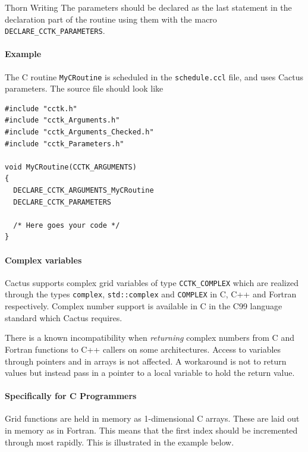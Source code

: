 \begin{cactuspart}{Thorn Writing}
The parameters should be declared as the last statement in the declaration part
of the routine using them with the macro \texttt{DECLARE\_CCTK\_PARAMETERS}.

\paragraph{Example}

The C routine \verb|MyCRoutine| is scheduled in the \texttt{schedule.ccl} file,
and uses Cactus parameters. The source file should look like
\begin{verbatim}
#include "cctk.h"
#include "cctk_Arguments.h"
#include "cctk_Arguments_Checked.h"
#include "cctk_Parameters.h"

void MyCRoutine(CCTK_ARGUMENTS)
{
  DECLARE_CCTK_ARGUMENTS_MyCRoutine
  DECLARE_CCTK_PARAMETERS

  /* Here goes your code */
}
\end{verbatim}

\paragraph{Complex variables}

Cactus supports complex grid variables of type \texttt{CCTK\_COMPLEX} which
are realized through the types \texttt{complex}, \texttt{std::complex} and
\texttt{COMPLEX} in C, C++ and Fortran respectively. Complex number support is
available in C in the C99 language standard which Cactus requires.

There is a known incompatibility when \emph{returning} complex numbers from C
and Fortran functions to C++ callers on some architectures. Access to
variables through pointers and in arrays is not affected. A workaround is not
to return values but instead pass in a pointer to a local variable to hold the
return value.

\paragraph{Specifically for C Programmers}

Grid functions are held in memory as 1-dimensional C arrays. These are laid
out in memory as in Fortran. This means that the first index should
be incremented through most rapidly.  This is illustrated in the example
below.


\end{cactuspart}
